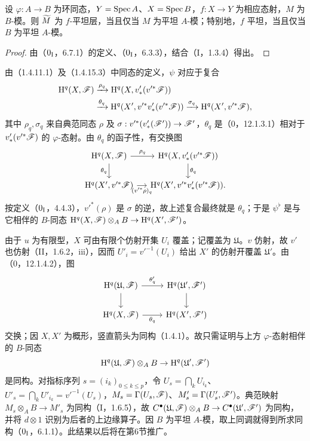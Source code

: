 设 $\varphi:A\to B$ 为环同态，$Y=\operatorname{Spec} A$、$X=\operatorname{Spec} B$，$f:X\to Y$ 为相应态射，$M$ 为 $B$-模。则 $\widetilde{M}$ 为 $f$-平坦层，当且仅当 $M$ 为平坦 $A$-模；特别地，$f$ 平坦，当且仅当 $B$ 为平坦 $A$-模。
\begin{proof}由（$0_{\mathrm I}$，6.7.1）的定义、（$0_{\mathrm I}$，6.3.3），结合（I，1.3.4）得出。\end{proof}
由（1.4.11.1）及（1.4.15.3）中同态的定义，$\psi$ 对应于复合
\[
\begin{aligned}
\mathrm H^q(X,\mathscr F)&\xrightarrow{\rho_q}\mathrm H^q(X,v'_*(v'^*\mathscr F))\\
&\xrightarrow{\theta_q}\mathrm H^q(X',v'^*v'_*(v'^*\mathscr F))
\xrightarrow{\sigma_q}\mathrm H^q(X',v'^*\mathscr F),
\end{aligned}
\]
其中 $\rho_q,\sigma_q$ 来自典范同态 $\rho$ 及 $\sigma:v'^*(v'_*(\mathscr F'))\to\mathscr F'$，$\theta_q$ 是（0，12.1.3.1）相对于 $v'_*(v'^*\mathscr F)$ 的 $\varphi$-态射。由 $\theta_q$ 的函子性，有交换图
\[
\begin{tikzcd}[column sep=small]
\mathrm H^q(X,\F)\arrow[r,"\rho_q"]\arrow[d,"\theta_q"']&\mathrm H^q(X,v'_*(v'^*\F))\arrow[d,"\theta_q"]\\
\mathrm H^q(X',v'^*\F)\arrow[r,"(v'^*\rho)_q"']&\mathrm H^q(X',v'^*v'_*(v'^*\F)).
\end{tikzcd}
\]
按定义（$0_{\mathrm I}$，4.4.3），$v'^*(\rho)$ 是 $\sigma$ 的逆，故上述复合最终就是 $\theta_q$；于是 $\psi^\flat$ 是与它相伴的 $B$-同态
$\mathrm H^q(X,\mathscr F)\otimes_AB\to\mathrm H^q(X',\mathscr F')$。

由于 $u$ 为有限型，$X$ 可由有限个仿射开集 $U_i$ 覆盖；记覆盖为 $\mathfrak U$。$v$ 仿射，故 $v'$ 也仿射（II，1.6.2，iii），因而 $U'_i=v'^{-1}(U_i)$ 给出 $X'$ 的仿射开覆盖 $\mathfrak U'$。由（0，12.1.4.2），图
\[
\begin{tikzcd}
\mathrm H^q(\mathfrak U,\F)\arrow[r,"\theta'_q"]\arrow[d]&\mathrm H^q(\mathfrak U',\F')\arrow[d]\\
\mathrm H^q(X,\F)\arrow[r,"\theta_q"']&\mathrm H^q(X',\F')
\end{tikzcd}
\]
交换；因 $X,X'$ 为概形，竖直箭头为同构（1.4.1）。故只需证明与上方 $\varphi$-态射相伴的 $B$-同态
\[
\mathrm H^q(\mathfrak U,\mathscr F)\otimes_AB\to\mathrm H^q(\mathfrak U',\mathscr F')
\]
是同构。对指标序列 $s=(i_k)_{0\leq k\leq p}$，令 $U_s=\bigcap_kU_{i_k}$、$U'_s=\bigcap_kU'_{i_k}=v'^{-1}(U_s)$，$M_s=\Gamma(U_s,\mathscr F)$、$M'_s=\Gamma(U'_s,\mathscr F')$。典范映射 $M_s\otimes_AB\to M'_s$ 为同构（I，1.6.5），故
$C^\bullet(\mathfrak U,\mathscr F)\otimes_AB\to C^\bullet(\mathfrak U',\mathscr F')$ 为同构，并将 $d\otimes1$ 识别为后者的上边缘算子。因 $B$ 为平坦 $A$-模，取上同调就得到所求同构（$0_{\mathrm I}$，6.1.1）。此结果以后将在第6节推广。\finishproof

